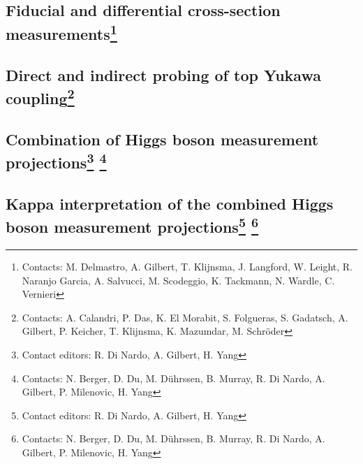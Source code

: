 \documentclass[../report.tex]{subfiles}
\providecommand{\main}{..}
\begin{document}
\subsection[Fiducial and differential cross-section measurements]{Fiducial and differential cross-section measurements\footnote{Contacts: M. Delmastro,  A. Gilbert, T. Klijnsma, J. Langford, W. Leight, R. Naranjo Garcia, A. Salvucci, M. Scodeggio, K. Tackmann, N. Wardle, C. Vernieri }}
\label{sec2:fiducial}



\subsection[Direct and indirect probing of top Yukawa coupling]{Direct and indirect probing of top Yukawa coupling\footnote{Contacts: A. Calandri,  P. Das, K. El Morabit, S. Folgueras, S. Gadatsch,  A. Gilbert, P. Keicher, T. Klijnsma, K. Mazumdar, M. Schr\"oder    
}}
\label{sec2:top}


\subsection[Combination of Higgs boson measurement projections]{Combination of Higgs boson measurement projections\footnote{Contact editors: R. Di Nardo, A. Gilbert, H. Yang}
\footnote{Contacts: N. Berger, D. Du, M. D\"uhrssen, B. Murray, R. Di Nardo, A. Gilbert, P. Milenovic, H. Yang}}
\label{sec2:exp_combination}


\subsection[Kappa interpretation of the combined Higgs boson measurement projections]{Kappa interpretation of the combined Higgs boson measurement projections\footnote{Contact editors: R. Di Nardo, A. Gilbert, H. Yang}
\footnote{Contacts: N. Berger, D. Du, M. D\"uhrssen, B. Murray, R. Di Nardo, A. Gilbert, P. Milenovic, H. Yang}}
\label{sec2:exp_kappa}

\end{document}
